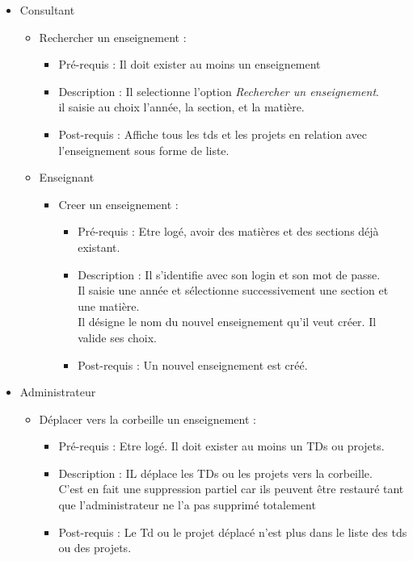 	\begin{itemize}
	\item Consultant
		\begin{itemize}
		\item Rechercher un enseignement :
			\begin{itemize}
			\item Pr{\'e}-requis : Il doit exister au moins un enseignement
			\item Description : Il selectionne l'option {\it Rechercher un enseignement}.\\
			il saisie au choix l'ann{\'e}e, la section, et la mati{\`e}re. 
			\item Post-requis : Affiche tous les tds et les projets en relation avec l'enseignement sous forme de liste.
			\end{itemize}


	\item Enseignant
		\begin{itemize}
		\item Creer un enseignement :
			\begin{itemize}
			\item Pr{\'e}-requis : Etre log{\'e}, avoir des mati{\`e}res et des sections d{\'e}j{\`a} existant. 
			\item Description : Il s'identifie avec son login et son mot de passe. \\
			Il saisie une ann{\'e}e et s{\'e}lectionne successivement une section et une mati{\`e}re.\\
			Il d{\'e}signe le nom du nouvel enseignement qu'il veut cr{\'e}er. Il valide ses choix.
			\item Post-requis : Un nouvel enseignement est cr{\'e}{\'e}.
			\end{itemize}
		\end{itemize}
	\end{itemize}


	\item Administrateur
		\begin{itemize}
		\item D{\'e}placer vers la corbeille un enseignement :
			\begin{itemize}
			\item Pr{\'e}-requis : Etre log{\'e}. Il doit exister au moins un TDs ou projets.\\
			\item Description : IL d{\'e}place les TDs ou les projets vers la corbeille.\\
			 C'est en fait une suppression partiel car ils peuvent {\^e}tre restaur{\'e} tant que l'administrateur ne l'a pas supprim{\'e} totalement\\
			\item Post-requis : Le Td ou le projet d{\'e}plac{\'e} n'est plus dans le liste des tds ou des projets.
			\end{itemize}
		\end{itemize}
	

\end{itemize}
